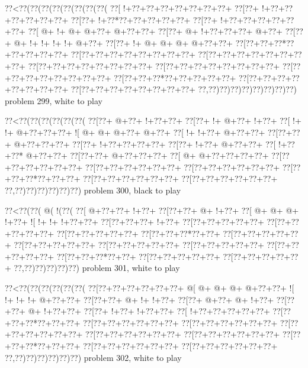 \vbox{\vbox{\goo
\0??<\0??(\0??(\0??(\0??(\0??(\0??(\0??(\0??(
\0??[\- !+\0??+\0??+\0??+\0??+\0??+\0??+\0??+
\0??[\0??+\- !+\0??+\0??+\0??+\0??+\0??+\0??+
\0??[\0??+\- !+\0??*\0??+\0??+\0??+\0??+\0??+
\0??[\0??+\- !+\0??+\0??+\0??+\0??+\0??+\0??+
\0??[\- @+\- !+\- @+\- @+\0??+\- @+\0??+\0??+
\0??[\0??+\- @+\- !+\0??+\0??+\0??+\- @+\0??+
\0??[\0??+\- @+\- !+\- !+\- !+\- !+\- @+\0??+
\0??[\0??+\- !+\- @+\- @+\- @+\- @+\0??+\0??+
\0??[\0??+\0??+\0??*\0??+\0??+\0??+\0??+\0??+
\0??[\0??+\0??+\0??+\0??+\0??+\0??+\0??+\0??+
\0??[\0??+\0??+\0??+\0??+\0??+\0??+\0??+\0??+
\0??[\0??+\0??+\0??+\0??+\0??+\0??+\0??+\0??+
\0??[\0??+\0??+\0??+\0??+\0??+\0??+\0??+\0??+
\0??[\0??+\0??+\0??+\0??+\0??+\0??+\0??+\0??+
\0??[\0??+\0??+\0??*\0??+\0??+\0??+\0??+\0??+
\0??[\0??+\0??+\0??+\0??+\0??+\0??+\0??+\0??+
\0??[\0??+\0??+\0??+\0??+\0??+\0??+\0??+\0??+
\0??,\0??)\0??)\0??)\0??)\0??)\0??)\0??)\0??)
}
\hfil problem 299, white to play\hfil\break
}

\vbox{\vbox{\goo
\0??<\0??(\0??(\0??(\0??(\0??(\0??(
\0??[\0??+\- @+\0??+\- !+\0??+\0??+
\0??[\0??+\- !+\- @+\0??+\- !+\0??+
\0??[\- !+\- !+\- @+\0??+\0??+\0??+
\- ![\- @+\- @+\- @+\0??+\- @+\0??+
\0??[\- !+\- !+\0??+\- @+\0??+\0??+
\0??[\0??+\0??+\- @+\0??+\0??+\0??+
\0??[\0??+\- !+\0??+\0??+\0??+\0??+
\0??[\0??+\- !+\0??+\- @+\0??+\0??+
\0??[\- !+\0??+\0??*\- @+\0??+\0??+
\0??[\0??+\0??+\- @+\0??+\0??+\0??+
\0??[\- @+\- @+\0??+\0??+\0??+\0??+
\0??[\0??+\0??+\0??+\0??+\0??+\0??+
\0??[\0??+\0??+\0??+\0??+\0??+\0??+
\0??[\0??+\0??+\0??+\0??+\0??+\0??+
\0??[\0??+\0??+\0??*\0??+\0??+\0??+
\0??[\0??+\0??+\0??+\0??+\0??+\0??+
\0??[\0??+\0??+\0??+\0??+\0??+\0??+
\0??,\0??)\0??)\0??)\0??)\0??)\0??)
}
\hfil problem 300, black to play\hfil\break
}

\vbox{\vbox{\goo
\0??<\0??(\0??(\- @(\- !(\0??(
\0??[\- @+\0??+\0??+\- !+\0??+
\0??[\0??+\0??+\- @+\- !+\0??+
\0??[\- @+\- @+\- @+\- !+\0??+
\- ![\- !+\- !+\- !+\0??+\0??+
\0??[\0??+\0??+\0??+\- !+\0??+
\0??[\0??+\0??+\0??+\0??+\0??+
\0??[\0??+\0??+\0??+\0??+\0??+
\0??[\0??+\0??+\0??+\0??+\0??+
\0??[\0??+\0??+\0??*\0??+\0??+
\0??[\0??+\0??+\0??+\0??+\0??+
\0??[\0??+\0??+\0??+\0??+\0??+
\0??[\0??+\0??+\0??+\0??+\0??+
\0??[\0??+\0??+\0??+\0??+\0??+
\0??[\0??+\0??+\0??+\0??+\0??+
\0??[\0??+\0??+\0??*\0??+\0??+
\0??[\0??+\0??+\0??+\0??+\0??+
\0??[\0??+\0??+\0??+\0??+\0??+
\0??,\0??)\0??)\0??)\0??)\0??)
}
\hfil problem 301, white to play\hfil\break
}

\vbox{\vbox{\goo
\0??<\0??(\0??(\0??(\0??(\0??(\0??(
\0??[\0??+\0??+\0??+\0??+\0??+\0??+
\- @[\- @+\- @+\- @+\- @+\0??+\0??+
\- ![\- !+\- !+\- !+\- @+\0??+\0??+
\0??[\0??+\0??+\- @+\- !+\- !+\0??+
\0??[\0??+\- @+\0??+\- @+\- !+\0??+
\0??[\0??+\0??+\- @+\- !+\0??+\0??+
\0??[\0??+\- !+\0??+\- !+\0??+\0??+
\0??[\- !+\0??+\0??+\0??+\0??+\0??+
\0??[\0??+\0??+\0??*\0??+\0??+\0??+
\0??[\0??+\0??+\0??+\0??+\0??+\0??+
\0??[\0??+\0??+\0??+\0??+\0??+\0??+
\0??[\0??+\0??+\0??+\0??+\0??+\0??+
\0??[\0??+\0??+\0??+\0??+\0??+\0??+
\0??[\0??+\0??+\0??+\0??+\0??+\0??+
\0??[\0??+\0??+\0??*\0??+\0??+\0??+
\0??[\0??+\0??+\0??+\0??+\0??+\0??+
\0??[\0??+\0??+\0??+\0??+\0??+\0??+
\0??,\0??)\0??)\0??)\0??)\0??)\0??)
}
\hfil problem 302, white to play\hfil\break
}

